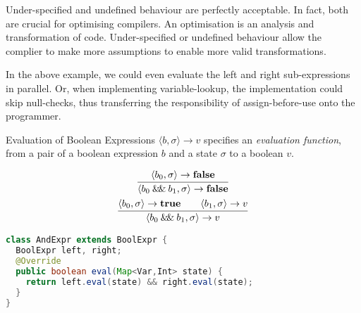 Under-specified and undefined behaviour are perfectly acceptable. In fact,
both are crucial for optimising compilers. An optimisation is an analysis and
transformation of code.  Under-specified or undefined behaviour allow the
complier to make more assumptions to enable more valid transformations.

In the above example, we could even evaluate the left and right
sub-expressions in parallel. Or, when implementing variable-lookup, the
implementation could skip null-checks, thus transferring the responsibility
of assign-before-use onto the programmer.

\begin{frame}[fragile]{Evaluation of Boolean Expressions}
    $\langle b, \sigma \rangle \rightarrow v$ specifies an \emph{evaluation
    function}, from a pair of a boolean expression $b$ and a state $\sigma$
    to a boolean $v$.
    \begin{overprint}
        \begin{gather*}
            \infer{\langle b_0 \doubleAmp b_1 , \sigma \rangle \rightarrow \mathbf{false}}{\langle b_0 , \sigma \rangle \rightarrow \mathbf{false}} \\
            \infer{\langle b_0 \doubleAmp b_1 , \sigma \rangle \rightarrow v}{\langle b_0 , \sigma \rangle \rightarrow \mathbf{true} \qquad \langle b_1 , \sigma \rangle \rightarrow v}
        \end{gather*}
        \begin{lstlisting}[language=java]
class AndExpr extends BoolExpr {
  BoolExpr left, right;
  @Override
  public boolean eval(Map<Var,Int> state) {
    return left.eval(state) && right.eval(state);
  }
}
        \end{lstlisting}
    \end{overprint}
\end{frame}

